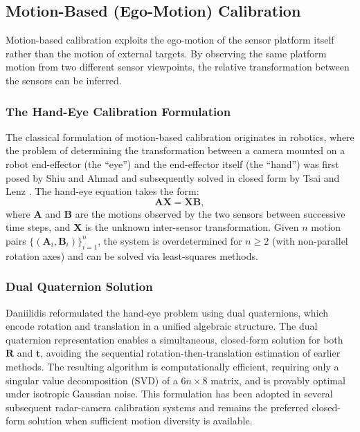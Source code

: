 \subsection{Motion-Based (Ego-Motion) Calibration}\label{sec:motion_based}

Motion-based calibration exploits the ego-motion of the sensor platform itself rather than the motion of external targets. By observing the same platform motion from two different sensor viewpoints, the relative transformation between the sensors can be inferred.

\subsubsection{The Hand-Eye Calibration Formulation}

The classical formulation of motion-based calibration originates in robotics, where the problem of determining the transformation between a camera mounted on a robot end-effector (the ``eye'') and the end-effector itself (the ``hand'') was first posed by Shiu and Ahmad and subsequently solved in closed form by Tsai and Lenz \cite{tsai1989technique}. The hand-eye equation takes the form:
\begin{equation}\label{eq:handeye}
  \mathbf{A}\mathbf{X} = \mathbf{X}\mathbf{B},
\end{equation}
where $\mathbf{A}$ and $\mathbf{B}$ are the motions observed by the two sensors between successive time steps, and $\mathbf{X}$ is the unknown inter-sensor transformation. Given $n$ motion pairs $\{(\mathbf{A}_i, \mathbf{B}_i)\}_{i=1}^{n}$, the system is overdetermined for $n \geq 2$ (with non-parallel rotation axes) and can be solved via least-squares methods.

\subsubsection{Dual Quaternion Solution}

Daniilidis \cite{daniilidis1999handeye} reformulated the hand-eye problem using dual quaternions, which encode rotation and translation in a unified algebraic structure. The dual quaternion representation enables a simultaneous, closed-form solution for both $\mathbf{R}$ and $\mathbf{t}$, avoiding the sequential rotation-then-translation estimation of earlier methods. The resulting algorithm is computationally efficient, requiring only a singular value decomposition (SVD) of a $6n \times 8$ matrix, and is provably optimal under isotropic Gaussian noise. This formulation has been adopted in several subsequent radar-camera calibration systems \cite{persic2019extrinsic} and remains the preferred closed-form solution when sufficient motion diversity is available.

